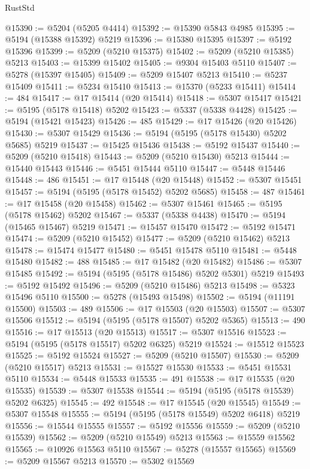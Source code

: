 \begin{lexlean}{RustStd}
\begin{coremodule}
@15390 := @5204 (@5205 @4414)
@15392 := @15390 @5843 @4985
@15395 := @5194 (@15388 @15392) @5219
@15396 := @15380 @15395
@15397 := @5192 @15396
@15399 := @5209 (@5210 @15375)
@15402 := @5209 (@5210 @15385) @5213
@15403 := @15399 @15402
@15405 := @9304 @15403 @5110
@15407 := @5278 (@15397 @15405)
@15409 := @5209 @15407 @5213
@15410 := @5237 @15409
@15411 := @5234 @15410
@15413 := @15370 (@5233 @15411)
@15414 := 484
@15417 := @17 @15414 (@20 @15414)
@15418 := @5307 @15417
@15421 := @5195 (@5178 @15418) @5202
@15423 := @5337 (@5338 @4428)
@15425 := @5194 (@15421 @15423)
@15426 := 485
@15429 := @17 @15426 (@20 @15426)
@15430 := @5307 @15429
@15436 := @5194 (@5195 (@5178 @15430) @5202 @5685) @5219
@15437 := @15425 @15436
@15438 := @5192 @15437
@15440 := @5209 (@5210 @15418)
@15443 := @5209 (@5210 @15430) @5213
@15444 := @15440 @15443
@15446 := @5451 @15444 @5110
@15447 := @5448 @15446
@15448 := 486
@15451 := @17 @15448 (@20 @15448)
@15452 := @5307 @15451
@15457 := @5194 (@5195 (@5178 @15452) @5202 @5685)
@15458 := 487
@15461 := @17 @15458 (@20 @15458)
@15462 := @5307 @15461
@15465 := @5195 (@5178 @15462) @5202
@15467 := @5337 (@5338 @4438)
@15470 := @5194 (@15465 @15467) @5219
@15471 := @15457 @15470
@15472 := @5192 @15471
@15474 := @5209 (@5210 @15452)
@15477 := @5209 (@5210 @15462) @5213
@15478 := @15474 @15477
@15480 := @5451 @15478 @5110
@15481 := @5448 @15480
@15482 := 488
@15485 := @17 @15482 (@20 @15482)
@15486 := @5307 @15485
@15492 := @5194 (@5195 (@5178 @15486) @5202 @5301) @5219
@15493 := @5192 @15492
@15496 := @5209 (@5210 @15486) @5213
@15498 := @5323 @15496 @5110
@15500 := @5278 (@15493 @15498)
@15502 := @5194 (@11191 @15500)
@15503 := 489
@15506 := @17 @15503 (@20 @15503)
@15507 := @5307 @15506
@15512 := @5194 (@5195 (@5178 @15507) @5202 @5365)
@15513 := 490
@15516 := @17 @15513 (@20 @15513)
@15517 := @5307 @15516
@15523 := @5194 (@5195 (@5178 @15517) @5202 @6325) @5219
@15524 := @15512 @15523
@15525 := @5192 @15524
@15527 := @5209 (@5210 @15507)
@15530 := @5209 (@5210 @15517) @5213
@15531 := @15527 @15530
@15533 := @5451 @15531 @5110
@15534 := @5448 @15533
@15535 := 491
@15538 := @17 @15535 (@20 @15535)
@15539 := @5307 @15538
@15544 := @5194 (@5195 (@5178 @15539) @5202 @6325)
@15545 := 492
@15548 := @17 @15545 (@20 @15545)
@15549 := @5307 @15548
@15555 := @5194 (@5195 (@5178 @15549) @5202 @6418) @5219
@15556 := @15544 @15555
@15557 := @5192 @15556
@15559 := @5209 (@5210 @15539)
@15562 := @5209 (@5210 @15549) @5213
@15563 := @15559 @15562
@15565 := @10926 @15563 @5110
@15567 := @5278 (@15557 @15565)
@15569 := @5209 @15567 @5213
@15570 := @5302 @15569

\end{coremodule}
\end{lexlean}
